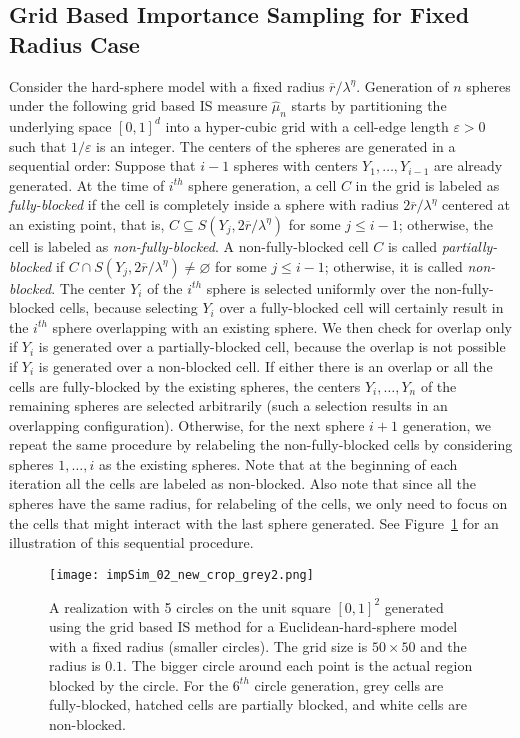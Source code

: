 \documentclass[11pt]{article}
\newcommand{\rbdd}{\overline{r}}
\newcommand{\wh}{\widehat}
\begin{document}
\subsection{Grid Based Importance Sampling for Fixed Radius Case}
\label{sec:improv-const}
Consider the hard-sphere model with a fixed radius $\rbdd/\lambda^\eta$. Generation of $n$ spheres {under the} following grid based IS measure $\wh \mu_n$ starts by partitioning the underlying space $[0,1]^d$ into a hyper-cubic grid with a cell-edge length $ \varepsilon > 0$  such that $1/\varepsilon$ is an integer. The centers of the spheres are generated in a sequential order: Suppose that $i-1$ spheres with centers $Y_1, \dots, Y_{i-1}$ are already generated. At the time of $i^{th}$ sphere generation, a cell $C$ in the grid  is labeled as {\em fully-blocked} if the cell is completely inside a sphere with radius $2\rbdd/\lambda^\eta$ centered at an existing point, that is, $C \subseteq S(Y_j, 2\rbdd/\lambda^\eta)$ for some $j \leq i-1$; otherwise, the cell is labeled as {\em non-fully-blocked}. A non-fully-blocked cell $C$ is called {\em partially-blocked} if  $C \cap S(Y_j, 2\rbdd/\lambda^\eta) \neq \varnothing$ for some $j \leq i-1$; otherwise, it is called {\em non-blocked}. The center $Y_i$ of the $i^{th}$ sphere is selected uniformly over the non-fully-blocked cells, because selecting $Y_i$ over a fully-blocked cell will certainly result in  the $i^{th}$ sphere overlapping with an existing sphere. We  then check for overlap only if $Y_i$ is generated over a partially-blocked cell, because the overlap is not possible if $Y_i$ is generated over a non-blocked cell.  If either there is an overlap or all the cells are fully-blocked by the existing spheres, the centers $Y_i, \dots, Y_n$ of the remaining spheres are selected arbitrarily (such a selection results in an overlapping configuration). Otherwise, for  the next sphere $i+1$ generation, we repeat the same procedure by relabeling the non-fully-blocked cells by considering spheres $1, \dots, i$ as the existing spheres. Note that at the beginning of each iteration all the cells are labeled as non-blocked. Also note that since all the spheres have the same radius, for relabeling of the cells, we  only need to focus on the cells that might interact with the  last sphere generated.  See Figure~\ref{pic:impSim} for an illustration of this sequential procedure. \\

 \begin{figure}[h]
\centering
\texttt{[image: impSim\_02\_new\_crop\_grey2.png]}
\caption{A realization with 5 circles on the unit square $[0,1]^2$ generated using the grid based IS method for a Euclidean-hard-sphere model with a fixed radius (smaller circles). The grid size is $50\times 50$ and the radius is $0.1$. The bigger circle around each point is the actual region blocked by the circle.
For the $6^{th}$ circle generation, grey cells are fully-blocked, hatched cells are partially blocked, and white cells are non-blocked.}
\label{pic:impSim}
\end{figure}
\end{document}
